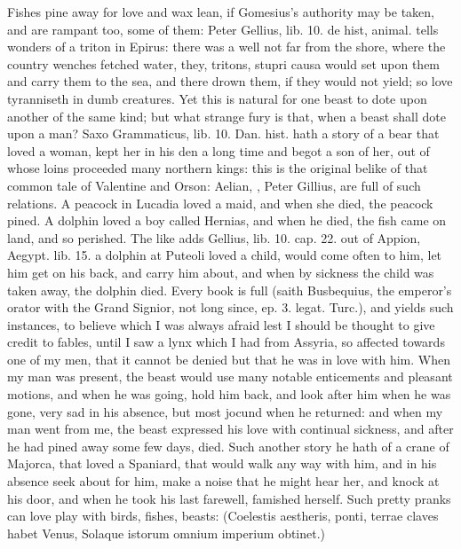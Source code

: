 Fishes pine away for love and wax lean, if Gomesius's authority
may be taken, and are rampant too, some of them: Peter Gellius, lib.
10. de hist, animal. tells wonders of a triton in Epirus: there was a
well not far from the shore, where the country wenches fetched water,
they, tritons, stupri causa would set upon them and carry them to
the sea, and there drown them, if they would not yield; so love
tyranniseth in dumb creatures. Yet this is natural for one beast to
dote upon another of the same kind; but what strange fury is that, when
a beast shall dote upon a man? Saxo Grammaticus, lib. 10. Dan. hist.
hath a story of a bear that loved a woman, kept her in his den a long
time and begot a son of her, out of whose loins proceeded many northern
kings: this is the original belike of that common tale of Valentine and
Orson: Aelian, \Pliny{}, Peter Gillius, are full of such relations. A
peacock in Lucadia loved a maid, and when she died, the peacock pined.
A dolphin loved a boy called Hernias, and when he died, the fish
came on land, and so perished. The like adds Gellius, lib. 10. cap. 22.
out of Appion, Aegypt. lib. 15. a dolphin at Puteoli loved a child,
would come often to him, let him get on his back, and carry him about,
and when by sickness the child was taken away, the dolphin died.
Every book is full (saith Busbequius, the emperor's orator with
the Grand Signior, not long since, ep. 3. legat. Turc.), and yields
such instances, to believe which I was always afraid lest I should be
thought to give credit to fables, until I saw a lynx which I had from
Assyria, so affected towards one of my men, that it cannot be denied
but that he was in love with him. When my man was present, the beast
would use many notable enticements and pleasant motions, and when he
was going, hold him back, and look after him when he was gone, very sad
in his absence, but most jocund when he returned: and when my man went
from me, the beast expressed his love with continual sickness, and
after he had pined away some few days, died. Such another story he hath
of a crane of Majorca, that loved a Spaniard, that would walk any way
with him, and in his absence seek about for him, make a noise that he
might hear her, and knock at his door, and when he took his last
farewell, famished herself. Such pretty pranks can love play with
birds, fishes, beasts:
(Coelestis aestheris, ponti, terrae claves habet Venus,
Solaque istorum omnium imperium obtinet.)

